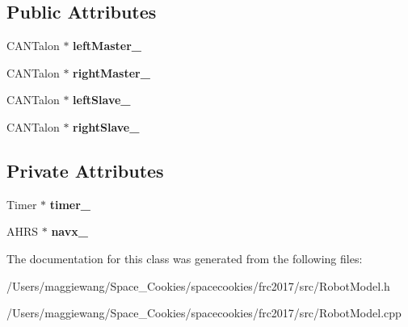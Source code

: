 \subsection*{Public Attributes}
\begin{DoxyCompactItemize}
\item 
\mbox{\label{class_robot_model_a4b24c35077efb8134a6c8c39dbec0a94}} 
C\+A\+N\+Talon $\ast$ {\bfseries left\+Master\+\_\+}
\item 
\mbox{\label{class_robot_model_a2dba54867affd957c357da252767cb12}} 
C\+A\+N\+Talon $\ast$ {\bfseries right\+Master\+\_\+}
\item 
\mbox{\label{class_robot_model_ab8412b3ded9c56ff0dc064c6bd717236}} 
C\+A\+N\+Talon $\ast$ {\bfseries left\+Slave\+\_\+}
\item 
\mbox{\label{class_robot_model_abfeab5e7111c28a26b070e811c1a5fd2}} 
C\+A\+N\+Talon $\ast$ {\bfseries right\+Slave\+\_\+}
\end{DoxyCompactItemize}
\subsection*{Private Attributes}
\begin{DoxyCompactItemize}
\item 
\mbox{\label{class_robot_model_a31809e8f8fddca2bf39ed07a2a6e9450}} 
Timer $\ast$ {\bfseries timer\+\_\+}
\item 
\mbox{\label{class_robot_model_a06263c46912cfbab7480fe2395b63533}} 
A\+H\+RS $\ast$ {\bfseries navx\+\_\+}
\end{DoxyCompactItemize}


The documentation for this class was generated from the following files\+:\begin{DoxyCompactItemize}
\item 
/\+Users/maggiewang/\+Space\+\_\+\+Cookies/spacecookies/frc2017/src/Robot\+Model.\+h\item 
/\+Users/maggiewang/\+Space\+\_\+\+Cookies/spacecookies/frc2017/src/Robot\+Model.\+cpp\end{DoxyCompactItemize}
